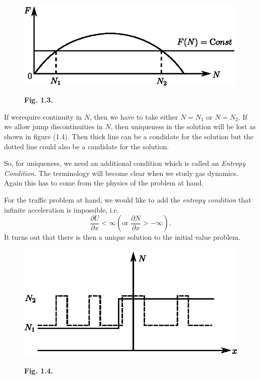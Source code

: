 \begin{figure}[H]
\centering
\includegraphics{figures/fig1.3.eps}
\centerline{\bf Fig. 1.3.}
\end{figure}

If we\pageoriginale require continuity in $N$, then we have to take either $N = N_1$ or $N = N_2$. If we allow jump discontinuities in $N$, then uniqueness in the solution will be lost as shown in figure (1.4). Then thick line can be a condidate for the solution but the dotted line could also be a candidate for the solution.

So, for uniqueness, we need an additional condition which is called an {\em Entropy Condition}. The terminology will become clear when we study gas dynamics. Again this has to come from the physics of the problem at hand.

For the traffic problem at hand, we would like to add the {\em entropy condition} that infinite acceleration is impossible, i.e.
$$
\frac{\partial U}{\partial x} < \infty (\text{or  }\frac{\partial N}{\partial x} > - \infty). 
$$
It turns out that there is then a unique solution to the initial value problem.

\begin{figure}[H]
\centering
\includegraphics{figures/fig1.4.eps}
\centerline{\bf Fig. 1.4.}
\end{figure}

